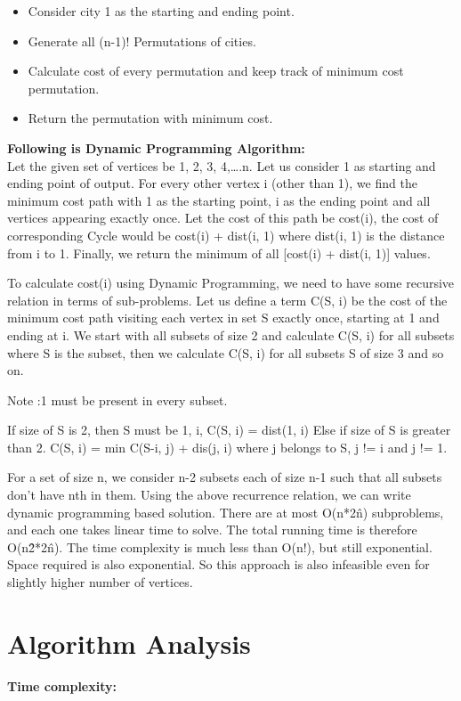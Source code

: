 \documentclass[conference]{IEEEtran}
\begin{document}
\begin{itemize}
\item Consider city 1 as the starting and ending point.
\item Generate all (n-1)! Permutations of cities.
\item Calculate cost of every permutation and keep track of minimum cost permutation.
\item Return the permutation with minimum cost.
\end{itemize}

\textbf{Following is Dynamic Programming Algorithm:}\\

Let the given set of vertices be {1, 2, 3, 4,….n}. Let us consider 1 as starting and ending point of output. For every other vertex i (other than 1), we find the minimum cost path with 1 as the starting point, i as the ending point and all vertices appearing exactly once. Let the cost of this path be cost(i), the cost of corresponding Cycle would be cost(i) + dist(i, 1) where dist(i, 1) is the distance from i to 1. Finally, we return the minimum of all [cost(i) + dist(i, 1)] values.

To calculate cost(i) using Dynamic Programming, we need to have some recursive relation in terms of sub-problems. Let us define a term C(S, i) be the cost of the minimum cost path visiting each vertex in set S exactly once, starting at 1 and ending at i.
We start with all subsets of size 2 and calculate C(S, i) for all subsets where S is the subset, then we calculate C(S, i) for all subsets S of size 3 and so on.

Note :1 must be present in every subset.

If size of S is 2, then S must be {1, i},
C(S, i) = dist(1, i)
Else if size of S is greater than 2.
C(S, i) = min { C(S-{i}, j) + dis(j, i)} where j belongs to S, j != i and j != 1.

For a set of size n, we consider n-2 subsets each of size n-1 such that all subsets don’t have nth in them.
Using the above recurrence relation, we can write dynamic programming based solution. There are at most O(n*2\^n) subproblems, and each one takes linear time to solve. The total running time is therefore O(n\^2*2\^n). The time complexity is much less than O(n!), but still exponential. Space required is also exponential. So this approach is also infeasible even for slightly higher number of vertices.

\section{Algorithm Analysis}
\textbf{Time complexity:}\\
\end{document}
